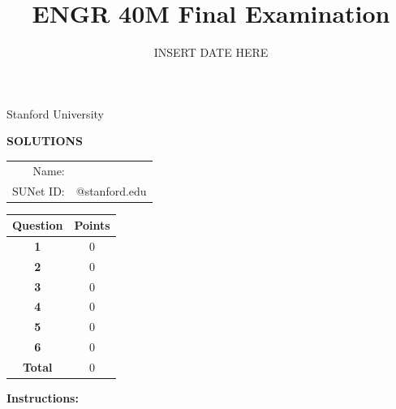 \documentclass[]{exam}  %
\begin{document}
\title{ENGR 40M Final Examination}
\date{INSERT DATE HERE}

\begin{center}
    \Large
    {\bfseries\makeatletter\@title\makeatother}

    \bigskip

    Stanford University

    \makeatletter\@date\makeatother

    \ifanswer
        \vspace{1pc}

        {\sffamily\bfseries SOLUTIONS}

        \vspace{1pc}
    \else
        \vfill

        \begin{tabular}{rp{10cm}}
            Name: & \hrulefill \\[1pc]
            SUNet ID: & \hrulefill @stanford.edu
        \end{tabular}

        \vfill
    \fi

    \normalsize
    \begin{tabular}{| >{\bfseries}c | c |}
        \hline
        Question & \bfseries Points \\
        \hline
        \hline
         1 &  0 \\ \hline
         2 &  0 \\ \hline
         3 &  0 \\ \hline
         4 &  0 \\ \hline
         5 &  0 \\ \hline
         6 &  0 \\ \hline
        \hline
        Total & 0 \\
        \hline
    \end{tabular}

\end{center}

\ifanswer\else

    \vfill

    \textbf{Instructions:}
\end{document}

